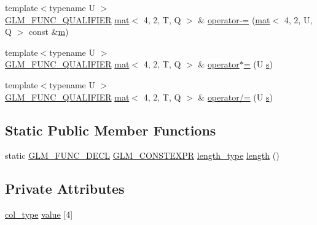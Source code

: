 \begin{DoxyCompactItemize}
{\footnotesize template$<$typename U $>$ }\\\mbox{\hyperlink{setup_8hpp_a33fdea6f91c5f834105f7415e2a64407}{G\+L\+M\+\_\+\+F\+U\+N\+C\+\_\+\+Q\+U\+A\+L\+I\+F\+I\+ER}} \mbox{\hyperlink{structglm_1_1mat}{mat}}$<$ 4, 2, T, Q $>$ \& \mbox{\hyperlink{structglm_1_1mat_3_014_00_012_00_01_t_00_01_q_01_4_abc0aa02f1c9179e82a6f41e59370f971}{operator-\/=}} (\mbox{\hyperlink{structglm_1_1mat}{mat}}$<$ 4, 2, U, Q $>$ const \&\mbox{\hyperlink{_s_d_l__opengl__glext_8h_af593500c283bf1a787a6f947f503a5c2}{m}})
\item 
{\footnotesize template$<$typename U $>$ }\\\mbox{\hyperlink{setup_8hpp_a33fdea6f91c5f834105f7415e2a64407}{G\+L\+M\+\_\+\+F\+U\+N\+C\+\_\+\+Q\+U\+A\+L\+I\+F\+I\+ER}} \mbox{\hyperlink{structglm_1_1mat}{mat}}$<$ 4, 2, T, Q $>$ \& \mbox{\hyperlink{structglm_1_1mat_3_014_00_012_00_01_t_00_01_q_01_4_aca18c66a3af57e5d99e420867c77792a}{operator$\ast$=}} (U \mbox{\hyperlink{_s_d_l__opengl_8h_a4af680a6c683f88ed67b76f207f2e6e4}{s}})
\item 
{\footnotesize template$<$typename U $>$ }\\\mbox{\hyperlink{setup_8hpp_a33fdea6f91c5f834105f7415e2a64407}{G\+L\+M\+\_\+\+F\+U\+N\+C\+\_\+\+Q\+U\+A\+L\+I\+F\+I\+ER}} \mbox{\hyperlink{structglm_1_1mat}{mat}}$<$ 4, 2, T, Q $>$ \& \mbox{\hyperlink{structglm_1_1mat_3_014_00_012_00_01_t_00_01_q_01_4_a654375437f4f6433308f1e41e5482c8f}{operator/=}} (U \mbox{\hyperlink{_s_d_l__opengl_8h_a4af680a6c683f88ed67b76f207f2e6e4}{s}})
\end{DoxyCompactItemize}
\subsection*{Static Public Member Functions}
\begin{DoxyCompactItemize}
\item 
static \mbox{\hyperlink{setup_8hpp_ab2d052de21a70539923e9bcbf6e83a51}{G\+L\+M\+\_\+\+F\+U\+N\+C\+\_\+\+D\+E\+CL}} \mbox{\hyperlink{setup_8hpp_a08b807947b47031d3a511f03f89645ad}{G\+L\+M\+\_\+\+C\+O\+N\+S\+T\+E\+X\+PR}} \mbox{\hyperlink{structglm_1_1mat_3_014_00_012_00_01_t_00_01_q_01_4_a4b192a2630331f70ca61657d9783026e}{length\+\_\+type}} \mbox{\hyperlink{structglm_1_1mat_3_014_00_012_00_01_t_00_01_q_01_4_ab3b1d2d2d45c52698509f170c3e0d866}{length}} ()
\end{DoxyCompactItemize}
\subsection*{Private Attributes}
\begin{DoxyCompactItemize}
\item 
\mbox{\hyperlink{structglm_1_1mat_3_014_00_012_00_01_t_00_01_q_01_4_a60138ab077eb3bef96e654e672af5059}{col\+\_\+type}} \mbox{\hyperlink{structglm_1_1mat_3_014_00_012_00_01_t_00_01_q_01_4_aa505bcd34286dbc23f599a6510908853}{value}} \mbox{[}4\mbox{]}
\end{DoxyCompactItemize}


